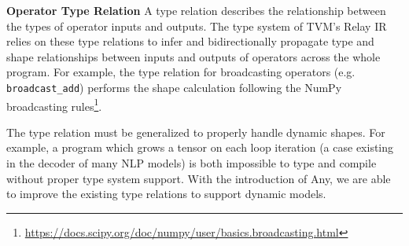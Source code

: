 \noindent
{\bf Operator Type Relation} A type relation describes the relationship between the types of operator inputs and outputs. The type system of TVM's Relay IR relies on these type relations to infer and bidirectionally propagate type and shape relationships between inputs and outputs of operators across the whole program.
For example, the type relation for broadcasting operators (e.g. \texttt{broadcast\_add}) performs the shape calculation following the NumPy broadcasting rules\footnote{\url{https://docs.scipy.org/doc/numpy/user/basics.broadcasting.html}}.

The type relation must be generalized to properly handle dynamic shapes. For example, a program which grows a tensor on each loop iteration (a case existing in the decoder of many NLP models) is both impossible to type and compile without proper type system support. With the introduction of Any, we are able to improve the existing type relations to support dynamic models.

